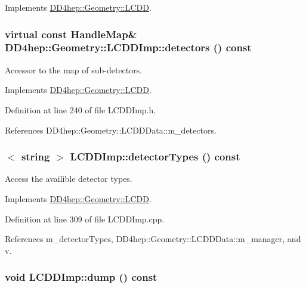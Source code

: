 Implements \hyperlink{class_d_d4hep_1_1_geometry_1_1_l_c_d_d_a0f8e72265d7c6fd7d0dcdd293e13031f}{DD4hep::Geometry::LCDD}.\hypertarget{class_d_d4hep_1_1_geometry_1_1_l_c_d_d_imp_a7ec6dc28b69a23fcdaff59e73fc7c440}{
\subsubsection[{detectors}]{\setlength{\rightskip}{0pt plus 5cm}virtual const {\bf HandleMap}\& DD4hep::Geometry::LCDDImp::detectors () const}}
\label{class_d_d4hep_1_1_geometry_1_1_l_c_d_d_imp_a7ec6dc28b69a23fcdaff59e73fc7c440}


Accessor to the map of sub-\/detectors. 

Implements \hyperlink{class_d_d4hep_1_1_geometry_1_1_l_c_d_d_ad06f71146140dc2682bc586ba7bffeaf}{DD4hep::Geometry::LCDD}.

Definition at line 240 of file LCDDImp.h.

References DD4hep::Geometry::LCDDData::m\_\-detectors.\hypertarget{class_d_d4hep_1_1_geometry_1_1_l_c_d_d_imp_a5d48161088950c2686eee7f28d58fde3}{
\subsubsection[{detectorTypes}]{$<$ {\bf string} $>$ LCDDImp::detectorTypes () const}}
\label{class_d_d4hep_1_1_geometry_1_1_l_c_d_d_imp_a5d48161088950c2686eee7f28d58fde3}


Access the availible detector types. 

Implements \hyperlink{class_d_d4hep_1_1_geometry_1_1_l_c_d_d_a196cc776b69db52d89f3396bf03d224f}{DD4hep::Geometry::LCDD}.

Definition at line 309 of file LCDDImp.cpp.

References m\_\-detectorTypes, DD4hep::Geometry::LCDDData::m\_\-manager, and v.\hypertarget{class_d_d4hep_1_1_geometry_1_1_l_c_d_d_imp_ad50f1540a6b3d99e049e1e4a91eabf8a}{
\subsubsection[{dump}]{\setlength{\rightskip}{0pt plus 5cm}void LCDDImp::dump () const}}
\label{class_d_d4hep_1_1_geometry_1_1_l_c_d_d_imp_ad50f1540a6b3d99e049e1e4a91eabf8a}


